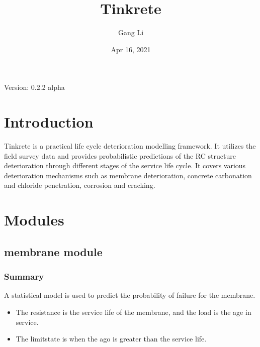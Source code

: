 \documentclass[letterpaper,10pt,english]{sphinxmanual}
\title{Tinkrete}
\date{Apr 16, 2021}
\author{Gang Li}
\begin{document}
\pagestyle{empty}
\sphinxmaketitle
\pagestyle{plain}
\sphinxtableofcontents
\pagestyle{normal}
\label{\detokenize{index::doc}}


\sphinxAtStartPar
Version:
0.2.2
alpha


\chapter{Introduction}
\label{\detokenize{intro:introduction}}\label{\detokenize{intro::doc}}
\sphinxAtStartPar
Tinkrete is a practical life cycle deterioration modelling framework.
It utilizes the field survey data and provides probabilistic predictions of the RC structure deterioration through different stages of the service life cycle.
It covers various deterioration mechanisms such as membrane deterioration, concrete carbonation and chloride penetration, corrosion and cracking.


\chapter{Modules}
\label{\detokenize{modules:modules}}\label{\detokenize{modules::doc}}

\section{membrane module}
\label{\detokenize{membrane:module-membrane}}\label{\detokenize{membrane:membrane-module}}\label{\detokenize{membrane::doc}}

\subsection{Summary}
\label{\detokenize{membrane:summary}}
\sphinxAtStartPar
A statistical model is used to predict the probability of failure for the membrane.
\begin{itemize}
\item {} 
\sphinxAtStartPar
The resistance is the service life of the membrane, and the load is the age in service.

\item {} 
\sphinxAtStartPar
The limit\sphinxhyphen{}state is when the ago is greater than the service life.

\end{itemize}
\end{document}
